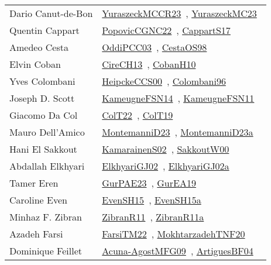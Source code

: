 {\begin{longtable}{p{4cm}p{20cm}}
Dario Canut{-}de{-}Bon & \href{articles/YuraszeckMCCR23.pdf}{YuraszeckMCCR23}~\cite{YuraszeckMCCR23}, \href{papers/YuraszeckMC23.pdf}{YuraszeckMC23}~\cite{YuraszeckMC23}\\
Quentin Cappart & \href{papers/PopovicCGNC22.pdf}{PopovicCGNC22}~\cite{PopovicCGNC22}, \href{papers/CappartS17.pdf}{CappartS17}~\cite{CappartS17}\\
Amedeo Cesta & \href{papers/OddiPCC03.pdf}{OddiPCC03}~\cite{OddiPCC03}, \href{papers/CestaOS98.pdf}{CestaOS98}~\cite{CestaOS98}\\
Elvin Coban & \href{papers/CireCH13.pdf}{CireCH13}~\cite{CireCH13}, \href{papers/CobanH10.pdf}{CobanH10}~\cite{CobanH10}\\
Yves Colombani & \href{articles/HeipckeCCS00.pdf}{HeipckeCCS00}~\cite{HeipckeCCS00}, \href{papers/Colombani96.pdf}{Colombani96}~\cite{Colombani96}\\
Joseph D. Scott & \href{articles/KameugneFSN14.pdf}{KameugneFSN14}~\cite{KameugneFSN14}, \href{papers/KameugneFSN11.pdf}{KameugneFSN11}~\cite{KameugneFSN11}\\
Giacomo Da Col & \href{articles/ColT22.pdf}{ColT22}~\cite{ColT22}, \href{papers/ColT19.pdf}{ColT19}~\cite{ColT19}\\
Mauro Dell'Amico & \href{articles/MontemanniD23.pdf}{MontemanniD23}~\cite{MontemanniD23}, \href{articles/MontemanniD23a.pdf}{MontemanniD23a}~\cite{MontemanniD23a}\\
Hani El Sakkout & \href{papers/KamarainenS02.pdf}{KamarainenS02}~\cite{KamarainenS02}, \href{articles/SakkoutW00.pdf}{SakkoutW00}~\cite{SakkoutW00}\\
Abdallah Elkhyari & \href{papers/ElkhyariGJ02.pdf}{ElkhyariGJ02}~\cite{ElkhyariGJ02}, \href{papers/ElkhyariGJ02a.pdf}{ElkhyariGJ02a}~\cite{ElkhyariGJ02a}\\
Tamer Eren & \href{articles/GurPAE23.pdf}{GurPAE23}~\cite{GurPAE23}, \href{articles/GurEA19.pdf}{GurEA19}~\cite{GurEA19}\\
Caroline Even & \href{papers/EvenSH15.pdf}{EvenSH15}~\cite{EvenSH15}, \href{articles/EvenSH15a.pdf}{EvenSH15a}~\cite{EvenSH15a}\\
Minhaz F. Zibran & \href{papers/ZibranR11.pdf}{ZibranR11}~\cite{ZibranR11}, \href{papers/ZibranR11a.pdf}{ZibranR11a}~\cite{ZibranR11a}\\
Azadeh Farsi & \href{}{FarsiTM22}~\cite{FarsiTM22}, \href{}{MokhtarzadehTNF20}~\cite{MokhtarzadehTNF20}\\
Dominique Feillet & \href{papers/Acuna-AgostMFG09.pdf}{Acuna-AgostMFG09}~\cite{Acuna-AgostMFG09}, \href{papers/ArtiguesBF04.pdf}{ArtiguesBF04}~\cite{ArtiguesBF04}\\

\end{longtable}}
